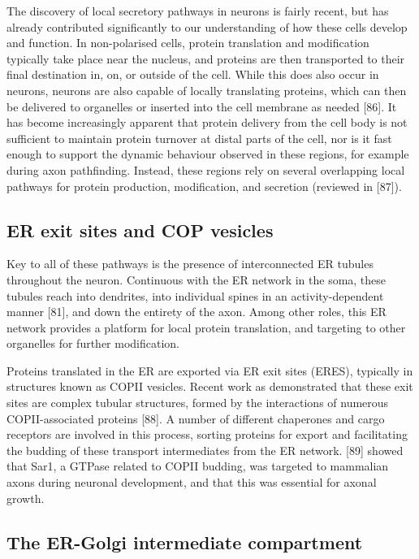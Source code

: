 \documentclass[
  12pt,
  a4paper,
]{book}
\begin{document}
The discovery of local secretory pathways in neurons is fairly recent, but has already contributed significantly to our understanding of how these cells develop and function. In non-polarised cells, protein translation and modification typically take place near the nucleus, and proteins are then transported to their final destination in, on, or outside of the cell. While this does also occur in neurons, neurons are also capable of locally translating proteins, which can then be delivered to organelles or inserted into the cell membrane as needed {[}86{]}. It has become increasingly apparent that protein delivery from the cell body is not sufficient to maintain protein turnover at distal parts of the cell, nor is it fast enough to support the dynamic behaviour observed in these regions, for example during axon pathfinding. Instead, these regions rely on several overlapping local pathways for protein production, modification, and secretion (reviewed in {[}87{]}).

\hypertarget{er-exit-sites-and-cop-vesicles}{%
\subsection{ER exit sites and COP vesicles}\label{er-exit-sites-and-cop-vesicles}}

Key to all of these pathways is the presence of interconnected ER tubules throughout the neuron. Continuous with the ER network in the soma, these tubules reach into dendrites, into individual spines in an activity-dependent manner {[}81{]}, and down the entirety of the axon. Among other roles, this ER network provides a platform for local protein translation, and targeting to other organelles for further modification.

Proteins translated in the ER are exported via ER exit sites (ERES), typically in structures known as COPII vesicles. Recent work as demonstrated that these exit sites are complex tubular structures, formed by the interactions of numerous COPII-associated proteins {[}88{]}. A number of different chaperones and cargo receptors are involved in this process, sorting proteins for export and facilitating the budding of these transport intermediates from the ER network. {[}89{]} showed that Sar1, a GTPase related to COPII budding, was targeted to mammalian axons during neuronal development, and that this was essential for axonal growth.

\hypertarget{the-er-golgi-intermediate-compartment}{%
\subsection{The ER-Golgi intermediate compartment}\label{the-er-golgi-intermediate-compartment}}
\end{document}
